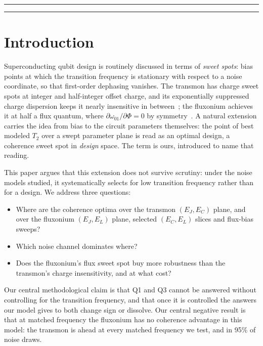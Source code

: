 \documentclass{SciPost}
\begin{document}
\vspace{\baselineskip}
\noindent\rule{\textwidth}{1pt}
\tableofcontents
\noindent\rule{\textwidth}{1pt}
\vspace{10pt}

\section{Introduction}

Superconducting qubit design is routinely discussed in terms of \emph{sweet spots}:
bias points at which the transition frequency is stationary with respect to a noise
coordinate, so that first-order dephasing vanishes. The transmon has charge sweet spots
at integer and half-integer offset charge, and its exponentially suppressed charge dispersion
keeps it nearly insensitive in between~\cite{koch2007}; the fluxonium achieves it at
half a flux quantum, where $\partial\omega_{01}/\partial\Phi = 0$ by
symmetry~\cite{nguyen2019}. A natural extension carries the idea from bias to the circuit parameters themselves: the
point of best modeled $T_2$ over a swept parameter plane is read as an optimal design, a
coherence sweet spot in \emph{design} space. The term is ours, introduced to name that reading.

This paper argues that this extension does not survive scrutiny: under the noise models
studied, it systematically selects for low transition frequency rather than for a design. We address three questions:

\begin{itemize}
\item[\textbf{Q1}] Where are the coherence optima over the transmon $(E_J, E_C)$ plane, and over
      the fluxonium $(E_J, E_L)$ plane, selected $(E_C, E_L)$ slices and flux-bias sweeps?
\item[\textbf{Q2}] Which noise channel dominates where?
\item[\textbf{Q3}] Does the fluxonium's flux sweet spot buy more robustness than the
      transmon's charge insensitivity, and at what cost?
\end{itemize}

Our central methodological claim is that Q1 and Q3 cannot be answered without controlling
for the transition frequency, and that once it is controlled the answers our model gives to both change sign or
dissolve. Our central negative result is that at matched frequency the fluxonium has no coherence advantage
in this model: the transmon is ahead at every matched frequency we test, and in 95\% of noise
draws.
\end{document}
